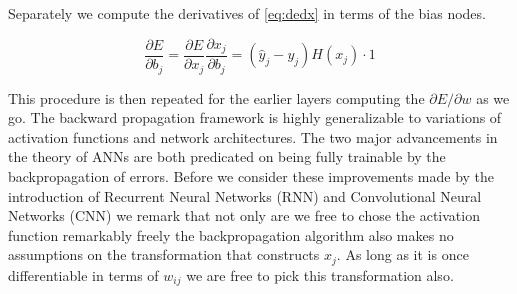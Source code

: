 \noindent Separately we compute the derivatives of \ref{eq:dedx} in terms of the bias nodes.

\begin{equation}
\frac{\partial E}{\partial b_j} = \frac{\partial E}{\partial x_j} \frac{\partial x_j}{\partial b_j} =   (\hat{y}_{j} - y_{j}) H(x_j) \cdot 1
\end{equation}

\noindent This procedure is then repeated for the earlier layers computing the $
\partial E / \partial w $ as we go. The backward propagation framework is highly generalizable to variations of activation functions and network architectures. The two major advancements in the theory of ANNs are both predicated on being fully trainable by the backpropagation of errors. Before we consider these improvements made by the introduction of Recurrent Neural Networks (RNN) and Convolutional Neural Networks (CNN) we remark that not only are we free to chose the activation function remarkably freely the backpropagation algorithm also makes no assumptions on the transformation that constructs $x_j$. As long as it is once differentiable in terms of $w_{ij}$ we are free to pick this transformation also. 
